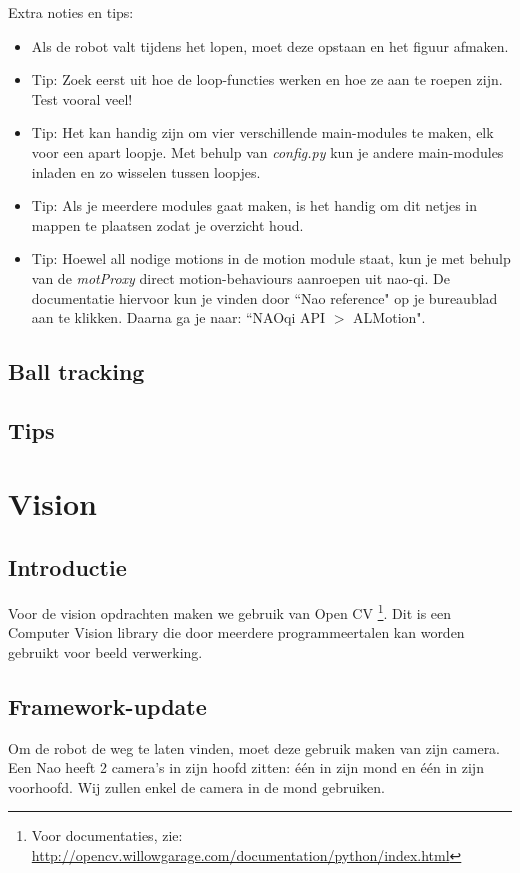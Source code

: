 \documentclass[a4paper, twoside]{article}
\begin{document}
Extra noties en tips:
\begin{itemize}
\item Als de robot valt tijdens het lopen, moet deze opstaan en het figuur afmaken.
\item Tip: Zoek eerst uit hoe de loop-functies werken en hoe ze aan te roepen zijn. Test vooral veel!
\item Tip: Het kan handig zijn om vier verschillende main-modules te maken, elk voor een apart loopje. Met behulp van \textit{config.py} kun je andere main-modules inladen en zo wisselen tussen loopjes.
\item Tip: Als je meerdere modules gaat maken, is het handig om dit netjes in mappen te plaatsen zodat je overzicht houd.

\item Tip: Hoewel all nodige motions in de motion module staat, kun je met behulp van de \textit{motProxy} direct motion-behaviours aanroepen uit nao-qi. De documentatie hiervoor kun je vinden door ``Nao reference" op je bureaublad aan te klikken. Daarna ga je naar: ``NAOqi API $>$ ALMotion". 
\end{itemize}

\subsection{Ball tracking}
\subsection{Tips}

\cleardoublepage
\section{Vision}
\subsection{Introductie}
Voor de vision opdrachten maken we gebruik van Open CV \footnote{Voor documentaties, zie: \\ \url{http://opencv.willowgarage.com/documentation/python/index.html}}. Dit is een Computer Vision library die door meerdere programmeertalen kan worden gebruikt voor beeld verwerking.

\subsection{Framework-update}
Om de robot de weg te laten vinden, moet deze gebruik maken van zijn camera. Een Nao heeft 2 camera's in zijn hoofd zitten: \'e\'en in zijn mond en \'e\'en in zijn voorhoofd. Wij zullen enkel de camera in de mond gebruiken.
\end{document}
